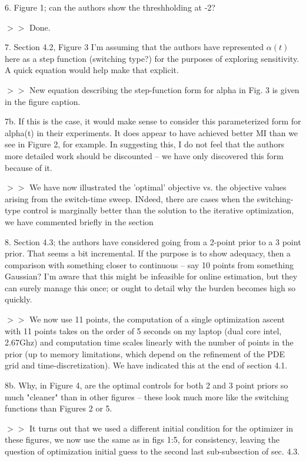 \documentclass[12pt]{article}
\begin{document}
6. Figure 1; can the authors show the threshholding at -2?

$>>$ Done.

7. Section 4.2, Figure 3 I'm assuming that the authors have represented
$\alpha(t)$ here as a step function (switching type?) for the purposes of
exploring sensitivity. A quick equation would help make that explicit.

$>>$ New equation describing the step-function form for alpha in Fig. 3 is given
in the figure caption.

7b. If this is the case, it would make sense to consider this parameterized form
for alpha(t) in their experiments. It does appear to have achieved better MI than we
see in Figure 2, for example. In suggesting this, I do not feel that the authors
more detailed work should be discounted -- we have only discovered this form because of it.

$>>$ We have now illustrated the 'optimal' objective vs. the objective values
arising from the switch-time sweep. INdeed, there are cases when the
switching-type control is marginally better than the solution to the iterative
optimization, we have commented briefly in the section 

8. Section 4.3; the authors have considered going from a 2-point prior to a 3
point prior. That seems a bit incremental. If the purpose is to show adequacy,
then a comparison with something closer to continuous -- say 10 points from
something Gaussian? I'm aware that this might be infeasible for online
estimation, but they can surely manage this once; or ought to detail why the
burden becomes high so quickly.

$>>$ We now use 11 points, the computation of a single optimization ascent
with 11 points takes on the order of 5 seconds on my laptop (dual core intel,
2.67Ghz) and computation time scales linearly with the number of points in
the prior (up to memory limitations, which depend on the refinement of the PDE
grid and time-discretization). We have indicated this at the end of section 4.1.

8b. Why, in Figure 4, are the optimal controls for both 2 and 3 point priors so
much "cleaner" than in other figures -- these look much more like the switching
functions than Figures 2 or 5.

$>>$ It turns out that we used a different initial condition for the optimizer
in these figures, we now use the same as in figs 1:5, for consistency, leaving
the question of optimization initial guess to the second last sub-subsection of
sec. 4.3. 
\end{document}
